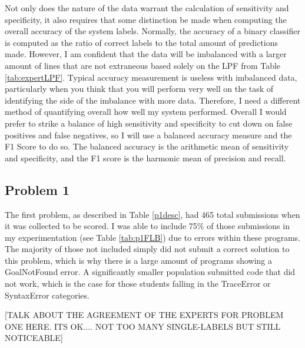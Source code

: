 \documentclass[draft]{article}
\begin{document}
Not only does the nature of the data warrant the calculation of sensitivity and specificity, it also requires that some distinction be made when computing the overall accuracy of the system labels. Normally, the accuracy of a binary classifier is computed as the ratio of correct labels to the total amount of predictions made. However, I am confident that the data will be imbalanced with a larger amount of lines that are not extraneous based solely on the LPF from Table \ref{tab:expertLPF}. Typical accuracy measurement is useless with imbalanced data, particularly when you think that you will perform very well on the task of identifying the side of the imbalance with more data. Therefore, I need a different method of quantifying overall how well my system performed. Overall I would prefer to strike a balance of high sensitivity and specificity to cut down on false positives and false negatives, so I will use a balanced accuracy measure and the F1 Score to do so. The balanced accuracy is the arithmetic mean of sensitivity and specificity, and the F1 score is the harmonic mean of precision and recall. 

\subsection{Problem 1}




The first problem, as described in Table \ref{p1desc}, had 465 total submissions when it was collected to be scored. I was able to include 75\% of those submissions in my experimentation (see Table \ref{tab:p1FLB}) due to errors within these programs. The majority of those not included simply did not submit a correct solution to this problem, which is why there is a large amount of programs showing a GoalNotFound error. A significantly smaller population submitted code that did not work, which is the case for those students falling in the TraceError or SyntaxError categories. 

[TALK ABOUT THE AGREEMENT OF THE EXPERTS FOR PROBLEM ONE HERE. ITS OK.... NOT TOO MANY SINGLE-LABELS BUT STILL NOTICEABLE]






\end{document}

